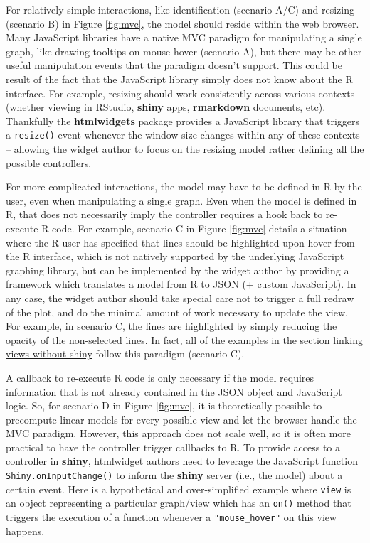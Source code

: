 \documentclass[12pt,]{isuthesis}
\begin{document}
For relatively simple interactions, like identification (scenario A/C)
and resizing (scenario B) in Figure \ref{fig:mvc}, the model should
reside within the web browser. Many JavaScript libraries have a native
MVC paradigm for manipulating a single graph, like drawing tooltips on
mouse hover (scenario A), but there may be other useful manipulation
events that the paradigm doesn't support. This could be result of the
fact that the JavaScript library simply does not know about the R
interface. For example, resizing should work consistently across various
contexts (whether viewing in RStudio, \textbf{shiny} apps,
\textbf{rmarkdown} documents, etc). Thankfully the \textbf{htmlwidgets}
package provides a JavaScript library that triggers a \texttt{resize()}
event whenever the window size changes within any of these contexts --
allowing the widget author to focus on the resizing model rather
defining all the possible controllers.

For more complicated interactions, the model may have to be defined in R
by the user, even when manipulating a single graph. Even when the model
is defined in R, that does not necessarily imply the controller requires
a hook back to re-execute R code. For example, scenario C in Figure
\ref{fig:mvc} details a situation where the R user has specified that
lines should be highlighted upon hover from the R interface, which is
not natively supported by the underlying JavaScript graphing library,
but can be implemented by the widget author by providing a framework
which translates a model from R to JSON (+ custom JavaScript). In any
case, the widget author should take special care not to trigger a full
redraw of the plot, and do the minimal amount of work necessary to
update the view. For example, in scenario C, the lines are highlighted
by simply reducing the opacity of the non-selected lines. In fact, all
of the examples in the section
\protect\hyperlink{linking-views-without-shiny}{linking views without
shiny} follow this paradigm (scenario C).

A callback to re-execute R code is only necessary if the model requires
information that is not already contained in the JSON object and
JavaScript logic. So, for scenario D in Figure \ref{fig:mvc}, it is
theoretically possible to precompute linear models for every possible
view and let the browser handle the MVC paradigm. However, this approach
does not scale well, so it is often more practical to have the
controller trigger callbacks to R. To provide access to a controller in
\textbf{shiny}, htmlwidget authors need to leverage the JavaScript
function \texttt{Shiny.onInputChange()} to inform the \textbf{shiny}
server (i.e., the model) about a certain event. Here is a hypothetical
and over-simplified example where \texttt{view} is an object
representing a particular graph/view which has an \texttt{on()} method
that triggers the execution of a function whenever a
\texttt{"mouse\_hover"} on this view happens.
\end{document}

